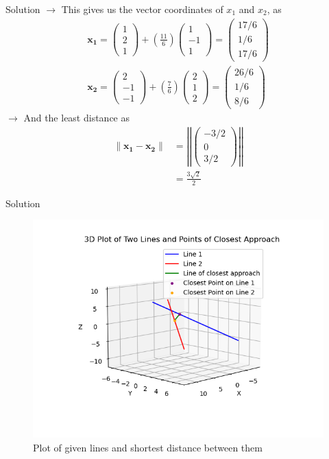 \documentclass{beamer}
\numberwithin{equation}{section}
\providecommand{\brak}[1]{\ensuremath{\left(#1\right)}}
\theoremstyle{remark}
\providecommand{\norm}[1]{\lVert#1\rVert}
\newcommand{\myvec}[1]{\ensuremath{\begin{pmatrix}#1\end{pmatrix}}}
\let\vec\mathbf
\begin{document}
\begin{frame}{Solution}
$\longrightarrow$ This gives us the vector coordinates of $x_1$ and $x_2$, as
\begin{align}
\vec{x_1} = \myvec{1\\2\\1} + \brak{\frac{11}{6}}\myvec{1\\-1\\1} = \myvec{17/6\\1/6\\17/6} \\
\vec{x_2} = \myvec{2\\-1\\-1} + \brak{\frac{7}{6}}\myvec{2\\1\\2} = \myvec{26/6\\1/6\\8/6}
\end{align}
$\rightarrow$ And the least distance as
\begin{align}
    \norm{\vec{x_1}-\vec{x_2}} &= \left|\left|\myvec{-3/2\\0\\3/2}\right|\right| \\
    &=\frac{3\sqrt{2}}{2}
\end{align} 
\end{frame}

\begin{frame}{Solution}
\begin{figure}[h!]
   \centering
   \includegraphics[width=0.85\linewidth]{figs/01.png}
   \caption{Plot of given lines and shortest distance between them}
   \label{Plot_1}
\end{figure}
\end{frame}
\end{document}
